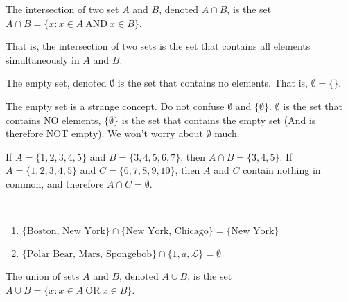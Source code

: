 \documentclass[crop=false,class=book,oneside]{standalone}
\begin{document}
            \begin{definition}
            The intersection of two set $A$ and $B$, denoted $A\cap B$, is the set $A\cap B = \{x:x\in A\ \textrm{AND}\ x\in B\}$.
            \end{definition}
            \begin{remark}
            That is, the intersection of two sets is the set that contains all elements simultaneously in $A$ and $B$.
            \end{remark}
            \begin{definition}
            The empty set, denoted $\emptyset$ is the set that contains no elements. That is, $\emptyset = \{\}$.
            \end{definition}
            \begin{remark}
            The empty set is a strange concept. Do not confuse $\emptyset$ and $\{\emptyset\}$. $\emptyset$ is the set that contains NO elements, $\{\emptyset\}$ is the set that contains the empty set (And is therefore NOT empty). We won't worry about $\emptyset$ much.
            \end{remark}
            \begin{example}
            If $A = \{1,2,3,4,5\}$ and $B = \{3,4,5,6,7\}$, then $A\cap B = \{3,4,5\}$. If $A = \{1,2,3,4,5\}$ and $C = \{6,7,8,9,10\}$, then $A$ and $C$ contain nothing in common, and therefore $A\cap C = \emptyset$.
            \end{example}
            \begin{example}
            \
            \begin{enumerate}
            \begin{multicols}{2}
            \item $\{1,2,3\}\cap \{3,4,5\} = \{3\}$
            \item $\{a,b,c\} \cap \{c,d,e\} = \{c\}$
            \end{multicols}
            \item $\{\textrm{Boston, New York}\} \cap \{\textrm{New York, Chicago}\} = \{\textrm{New York}\}$
            \item $\{\textrm{Polar Bear, Mars, Spongebob}\} \cap \{1,a,\mathcal{L}\} = \emptyset$
            \end{enumerate}
            \end{example}
            \begin{definition}
            The union of sets $A$ and $B$, denoted $A\cup B$, is the set $A\cup B = \{x:x\in A\ \textrm{OR}\ x\in B\}$.
            \end{definition}
\end{document}
